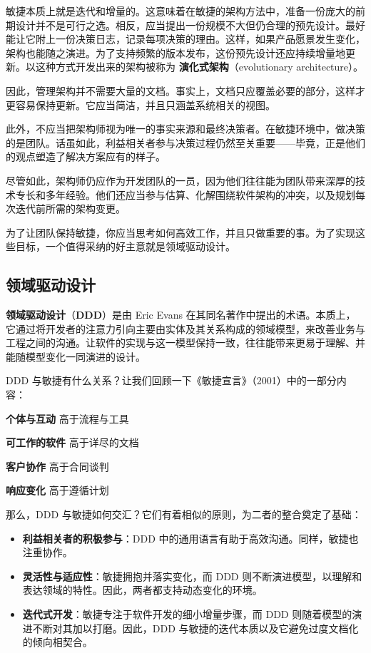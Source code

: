 \label{idx:019}
敏捷本质上就是迭代和增量的。这意味着在敏捷的架构方法中，准备一份庞大的前期设计并不是可行之选。相反，应当提出一份规模不大但仍合理的预先设计。最好能让它附上一份决策日志，记录每项决策的理由。这样，如果产品愿景发生变化，架构也能随之演进。为了支持频繁的版本发布，这份预先设计还应持续增量地更新。以这种方式开发出来的架构被称为 \textbf{演化式架构}（evolutionary architecture）。

因此，管理架构并不需要大量的文档。事实上，文档只应覆盖必要的部分，这样才更容易保持更新。它应当简洁，并且只涵盖系统相关的视图。

此外，不应当把架构师视为唯一的事实来源和最终决策者。在敏捷环境中，做决策的是团队。话虽如此，利益相关者参与决策过程仍然至关重要——毕竟，正是他们的观点塑造了解决方案应有的样子。

尽管如此，架构师仍应作为开发团队的一员，因为他们往往能为团队带来深厚的技术专长和多年经验。他们还应当参与估算、化解围绕软件架构的冲突，以及规划每次迭代前所需的架构变更。

\label{idx:020}
\label{idx:021}
为了让团队保持敏捷，你应当思考如何高效工作，并且只做重要的事。为了实现这些目标，一个值得采纳的好主意就是领域驱动设计。

\subsection{领域驱动设计}

\label{idx:022}
\label{idx:023}
\textbf{领域驱动设计}（\textbf{DDD}）是由 Eric Evans 在其同名著作中提出的术语。本质上，它通过将开发者的注意力引向主要由实体及其关系构成的领域模型，来改善业务与工程之间的沟通。让软件的实现与这一模型保持一致，往往能带来更易于理解、并能随模型变化一同演进的设计。

DDD 与敏捷有什么关系？让我们回顾一下《敏捷宣言》（2001）中的一部分内容：

\begin{myQuote}
\textbf{个体与互动} 高于流程与工具

\textbf{可工作的软件} 高于详尽的文档

\textbf{客户协作} 高于合同谈判

\textbf{响应变化} 高于遵循计划

\end{myQuote}

那么，DDD 与敏捷如何交汇？它们有着相似的原则，为二者的整合奠定了基础：

\begin{itemize}
\item \textbf{利益相关者的积极参与}：DDD 中的通用语言有助于高效沟通。同样，敏捷也注重协作。
\item \textbf{灵活性与适应性}：敏捷拥抱并落实变化，而 DDD 则不断演进模型，以理解和表达领域的特性。因此，两者都支持动态变化的环境。
\item \textbf{迭代式开发}：敏捷专注于软件开发的细小增量步骤，而 DDD 则随着模型的演进不断对其加以打磨。因此，DDD 与敏捷的迭代本质以及它避免过度文档化的倾向相契合。
\end{itemize}

